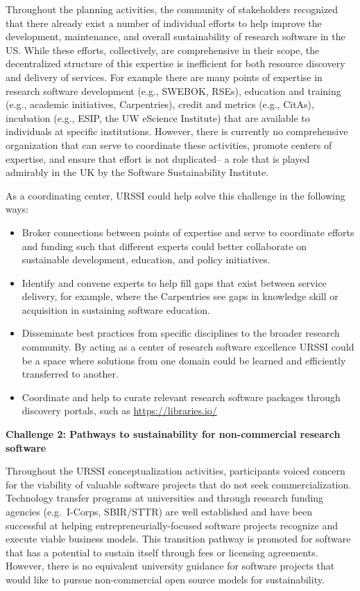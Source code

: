 \documentclass[
]{book}
\begin{document}
Throughout the planning activities, the community of stakeholders recognized
that there already exist a number of individual efforts to help improve the
development, maintenance, and overall sustainability of research software in
the US. While these efforts, collectively, are comprehensive in their scope,
the decentralized structure of this expertise is inefficient for both resource
discovery and delivery of services. For example there are many points of expertise
in research software development (e.g., SWEBOK, RSEs), education and training
(e.g., academic initiatives, Carpentries), credit and metrics (e.g., CitAs),
incubation (e.g., ESIP, the UW eScience Institute) that are available to
individuals at specific institutions. However, there is currently no comprehensive
organization that can serve to coordinate these activities, promote centers of
expertise, and ensure that effort is not duplicated-- a role that is played
admirably in the UK by the Software Sustainability Institute.

As a coordinating center, URSSI could help solve this challenge in the following ways:

\begin{itemize}
\item
  Broker connections between points of expertise and serve to coordinate
  efforts and funding such that different experts could better collaborate on
  sustainable development, education, and policy initiatives.
\item
  Identify and convene experts to help fill gaps that exist between service
  delivery, for example, where the Carpentries see gaps in knowledge skill or
  acquisition in sustaining software education.
\item
  Disseminate best practices from specific disciplines to the broader
  research community. By acting as a center of research software excellence
  URSSI could be a space where solutions from one domain could be learned and
  efficiently transferred to another.
\item
  Coordinate and help to curate relevant research software packages through
  discovery portals, such as \url{https://libraries.io/}
\end{itemize}

\textbf{Challenge 2: Pathways to sustainability for non-commercial research software}

Throughout the URSSI conceptualization activities, participants voiced concern
for the viability of valuable software projects that do not seek
commercialization. Technology transfer programs at universities and through
research funding agencies (e.g.~I-Corps, SBIR/STTR) are well established
and have been successful at helping entrepreneurially-focused software projects
recognize and execute viable business models. This transition pathway is
promoted for software that has a potential to sustain itself through fees or
licensing agreements. However, there is no equivalent university guidance for
software projects that would like to pursue non-commercial open source models
for sustainability.
\end{document}

